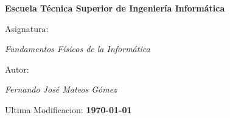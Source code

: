 \begin{titlepage}
        \centering
        {\bfseries\LARGE Escuela Técnica Superior de Ingeniería Informática \par}
        \vspace{1cm}
        {\Large Asignatura: \par \textit{Fundamentos Físicos de la Informática} \par}
        \vspace{1cm}
        {\Large Autor: \par \textit{Fernando José Mateos Gómez} \par}
        \vspace{2cm}
        {\Large Ultima Modificacion: \textbf{\today} \par}
        \vspace{2cm}
\end{titlepage}
\restoregeometry